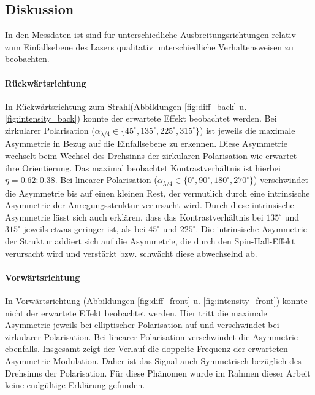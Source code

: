 \documentclass[titlepage]{article}
\begin{document}
	\subsection{Diskussion}
	In den Messdaten ist sind für unterschiedliche Ausbreitungsrichtungen relativ zum Einfallsebene des Lasers qualitativ unterschiedliche Verhaltensweisen zu beobachten.
	\paragraph{Rückwärtsrichtung}
	In Rückwärtsrichtung zum Strahl(Abbildungen \ref{fig:diff_back} u. \ref{fig:intensity_back}) konnte der erwartete Effekt beobachtet werden. Bei zirkularer Polarisation ($\alpha_{\lambda/4} \in \{45^\circ, 135^\circ, 225^\circ, 315^\circ\}$) ist jeweils die maximale Asymmetrie in Bezug auf die Einfallsebene zu erkennen. Diese Asymmetrie wechselt beim Wechsel des Drehsinns der zirkularen Polarisation wie erwartet ihre Orientierung. Das maximal beobachtet Kontrastverhältnis ist hierbei $\eta = 0.62:0.38$. Bei linearer Polarisation ($\alpha_{\lambda/4} \in \{0^\circ, 90^\circ, 180^\circ, 270^\circ\}$) verschwindet die Asymmetrie bis auf einen kleinen Rest, der vermutlich durch eine intrinsische Asymmetrie der Anregungsstruktur verursacht wird. Durch diese intrinsische Asymmetrie lässt sich auch erklären, dass das Kontrastverhältnis bei $135^\circ$ und $ 315^\circ$ jeweils etwas geringer ist, als bei $45^\circ$ und $225^\circ$.
	Die intrinsische Asymmetrie der Struktur addiert sich auf die Asymmetrie, die durch den Spin-Hall-Effekt verursacht wird und verstärkt bzw. schwächt diese abwechselnd ab.
	\paragraph{Vorwärtsrichtung}
	In Vorwärtsrichtung (Abbildungen \ref{fig:diff_front} u. \ref{fig:intensity_front}) konnte nicht der erwartete Effekt beobachtet werden. Hier tritt die maximale Asymmetrie jeweils bei elliptischer Polarisation auf und verschwindet bei zirkularer Polarisation. Bei linearer Polarisation verschwindet die Asymmetrie ebenfalls. Insgesamt zeigt der Verlauf die doppelte Frequenz der erwarteten Asymmetrie Modulation. Daher ist das Signal auch Symmetrisch bezüglich des Drehsinns der Polarisation. Für diese Phänomen wurde im Rahmen dieser Arbeit keine endgültige Erklärung gefunden.
	
\end{document}
